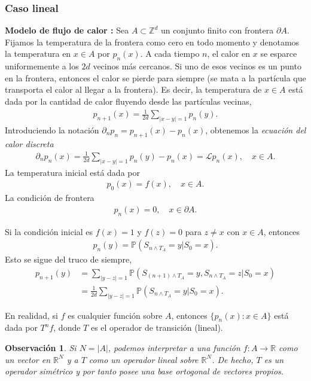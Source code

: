 \documentclass{article}
\newtheorem{obs}[theorem]{Observación}
\numberwithin{equation}{section}
\begin{document}
\subsubsection{Caso lineal}
\textbf{Modelo de flujo de calor : } Sea $A \subset \mathbb{Z}^d$ un conjunto finito con frontera $\partial A$. Fijamos la temperatura de la frontera como cero en todo momento y denotamos la temperatura en $x \in A$ por $p_n(x)$. A cada tiempo $n$, el calor en $x$ se esparce uniformemente a los $2d$ vecinos más cercanos. Si uno de esos vecinos es un punto en la frontera, entonces el calor se pierde para siempre (se mata a la partícula que transporta el calor al llegar a la frontera). Es decir, la temperatura de $x \in A$ está dada por la cantidad de calor fluyendo desde las partículas vecinas,
\begin{align*}
    p_{n+1}(x) = \frac{1}{2d}\sum_{|x-y| = 1}p_n(y).
\end{align*}
Introduciendo la notación $\partial_n p_n = p_{n+1}(x) - p_n(x)$, obtenemos la \emph{ecuación del calor discreta}
\begin{align}\label{ec-calor}
    \partial_np_n(x) = \frac{1}{2d}\sum_{|x-y| = 1}p_n(y) - p_n(x) = \mathcal{L}p_n(x), \quad x \in A.
\end{align}
La temperatura inicial está dada por
\begin{align}
    p_0(x) = f(x), \quad x \in A.
\end{align}
La condición de frontera
\begin{align}
    p_n(x) = 0, \quad x \in \partial A.
\end{align}

Si la condición inicial es $f(x) = 1$ y $f(z) = 0$ para $z \not = x$ con $x \in A$, entonces
\begin{align*}
    p_n(y) = \mathbb{P}(S_{n\land T_A} = y | S_0 = x).
\end{align*}
Esto se sigue del truco de siempre,
\begin{align*}
    p_{n+1}(y) &= \sum_{|y-z|=1}\mathbb{P}(S_{(n+1)\land T_A} = y, S_{n\land T_A}=z | S_0 = x)\\
    &= \frac{1}{2d}\sum_{|y-z|=1}\mathbb{P}(S_{n\land T_A}=y | S_0 = x).
\end{align*}

En realidad, si $f$ es cualquier función sobre $A$, entonces $\{p_n(x) : x \in A\}$ está dada por $T^nf$, donde $T$ es el operador de transición (lineal).

\begin{obs}
    Si $N = | A|$, podemos interpretar a una función $f : A \to \mathbb{R} $ como un vector en $\mathbb{R}^N$ y a $T$ como un operador lineal sobre $ \mathbb{R}^N$. De hecho, $T$ es un operador simétrico y por tanto posee una base ortogonal de vectores propios.
\end{obs}
\end{document}
